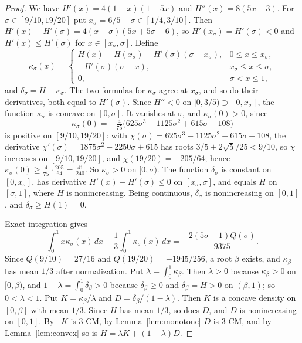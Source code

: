 \documentclass[11pt]{amsart}
\theoremstyle{remark}
\numberwithin{equation}{section}
\begin{document}
\begin{proof}
We have $H'(x)=4(1-x)(1-5x)$ and $H''(x)=8(5x-3)$. For
$\sigma\in[9/10,19/20]$ put $x_\sigma=6/5-\sigma\in[1/4,3/10]$. Then
$H'(x)-H'(\sigma)=4(x-\sigma)(5x+5\sigma-6)$, so $H'(x_\sigma)=H'(\sigma)<0$ and $H'(x)\le H'(\sigma)$ for
$x\in[x_\sigma,\sigma]$. Define
\[
\kappa_\sigma(x)=
\begin{cases}
H(x)-H(x_\sigma)-H'(\sigma)(\sigma-x_\sigma), & 0\le x\le x_\sigma,\\
-H'(\sigma)(\sigma-x), & x_\sigma\le x\le \sigma,\\
0, & \sigma<x\le1,
\end{cases}
\]
and $\delta_\sigma=H-\kappa_\sigma$. The two formulas for $\kappa_\sigma$ agree at $x_\sigma$,
and so do their derivatives, both equal to $H'(\sigma)$. Since $H''<0$ on
$[0,3/5)\supset[0,x_\sigma]$, the function $\kappa_\sigma$ is concave on $[0,\sigma]$. It
vanishes at $\sigma$, and $\kappa_\sigma(0)>0$, since
\[
\kappa_\sigma(0)=-\tfrac4{75}\bigl(625\sigma^3-1125\sigma^2+615\sigma-108\bigr)
\]
is positive on $[9/10,19/20]$: with
$\chi(\sigma)=625\sigma^3-1125\sigma^2+615\sigma-108$, the derivative
$\chi'(\sigma)=1875\sigma^2-2250\sigma+615$ has roots
$3/5\pm2\sqrt5/25<9/10$, so $\chi$ increases on $[9/10,19/20]$, and
$\chi(19/20)=-205/64$; hence $\kappa_\sigma(0)\ge\tfrac4{75}\cdot\tfrac{205}{64}=\tfrac{41}{240}$. So
$\kappa_\sigma>0$ on $[0,\sigma)$. The function $\delta_\sigma$ is constant on $[0,x_\sigma]$,
has derivative $H'(x)-H'(\sigma)\le0$ on $[x_\sigma,\sigma]$, and equals $H$ on $[\sigma,1]$,
where $H$ is nonincreasing. Being continuous, $\delta_\sigma$ is nonincreasing on
$[0,1]$, and $\delta_\sigma\ge H(1)=0$.

Exact integration gives
\[
\int_0^1x\kappa_\sigma(x)\,dx-\frac13\int_0^1\kappa_\sigma(x)\,dx
=-\frac{2(5\sigma-1)Q(\sigma)}{9375}.
\]
Since $Q(9/10)=27/16$ and $Q(19/20)=-1945/256$, a root $\beta$ exists, and
$\kappa_\beta$ has mean $1/3$ after normalization. Put
$\lambda=\int_0^1\kappa_\beta$. Then $\lambda>0$ because $\kappa_\beta>0$ on
$[0,\beta)$, and $1-\lambda=\int_0^1\delta_\beta>0$ because $\delta_\beta\ge0$
and $\delta_\beta=H>0$ on $(\beta,1)$; so $0<\lambda<1$. Put $K=\kappa_\beta/\lambda$ and $D=\delta_\beta/(1-\lambda)$.
Then $K$ is a concave density on $[0,\beta]$ with mean $1/3$. Since $H$ has mean
$1/3$, so does $D$, and $D$ is nonincreasing on $[0,1]$. By~\cite[Theorem~4.2]{PWW12}
$K$ is $3$-CM, by Lemma~\ref{lem:monotone} $D$ is $3$-CM, and by
Lemma~\ref{lem:convex} so is $H=\lambda K+(1-\lambda)D$.
\end{proof}
\end{document}
